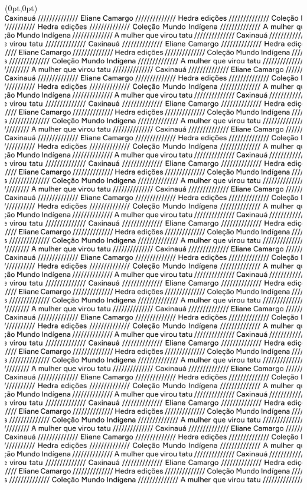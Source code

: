 \thispagestyle{empty}

\thispagestyle{empty}
\begin{textblock*}{2.625in}(0pt,0pt)%
\vspace*{-2.4cm}
\hspace*{-2.65cm}\includegraphics[width=138mm]{./MI_CAMARGO_TATU_ABERTURA.png}  
\end{textblock*}
\clearpage
\pagebreak

